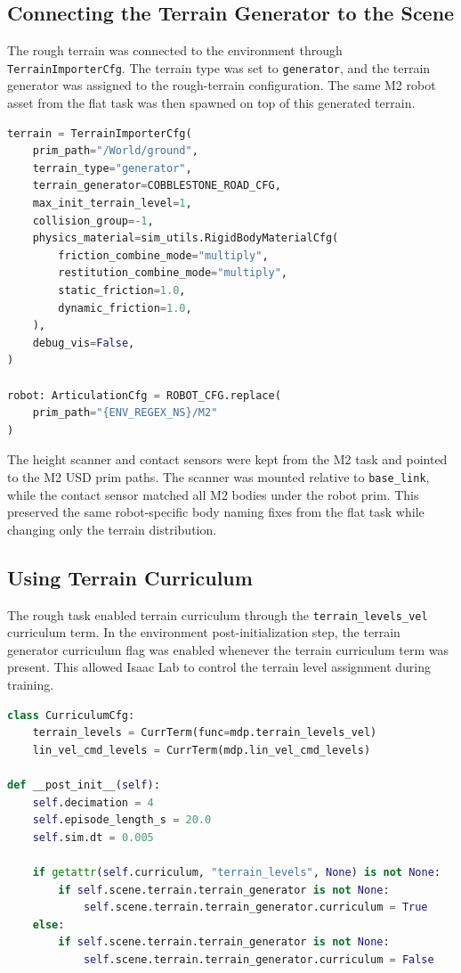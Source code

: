 \subsection{Connecting the Terrain Generator to the Scene}

The rough terrain was connected to the environment through \texttt{TerrainImporterCfg}. The terrain type
was set to \texttt{generator}, and the terrain generator was assigned to the rough-terrain configuration.
The same M2 robot asset from the flat task was then spawned on top of this generated terrain.

\begin{lstlisting}[language=Python,caption={Scene terrain importer for generated rough terrain.}]
terrain = TerrainImporterCfg(
    prim_path="/World/ground",
    terrain_type="generator",
    terrain_generator=COBBLESTONE_ROAD_CFG,
    max_init_terrain_level=1,
    collision_group=-1,
    physics_material=sim_utils.RigidBodyMaterialCfg(
        friction_combine_mode="multiply",
        restitution_combine_mode="multiply",
        static_friction=1.0,
        dynamic_friction=1.0,
    ),
    debug_vis=False,
)

robot: ArticulationCfg = ROBOT_CFG.replace(
    prim_path="{ENV_REGEX_NS}/M2"
)
\end{lstlisting}

The height scanner and contact sensors were kept from the M2 task and pointed to the M2 USD prim
paths. The scanner was mounted relative to \texttt{base\_link}, while the contact sensor matched all M2
bodies under the robot prim. This preserved the same robot-specific body naming fixes from the flat task
while changing only the terrain distribution.

\subsection{Using Terrain Curriculum}

The rough task enabled terrain curriculum through the \texttt{terrain\_levels\_vel} curriculum term. In
the environment post-initialization step, the terrain generator curriculum flag was enabled whenever the
terrain curriculum term was present. This allowed Isaac Lab to control the terrain level assignment during
training.

\begin{lstlisting}[language=Python,caption={Enabling terrain curriculum for the rough generator.}]
class CurriculumCfg:
    terrain_levels = CurrTerm(func=mdp.terrain_levels_vel)
    lin_vel_cmd_levels = CurrTerm(mdp.lin_vel_cmd_levels)

def __post_init__(self):
    self.decimation = 4
    self.episode_length_s = 20.0
    self.sim.dt = 0.005

    if getattr(self.curriculum, "terrain_levels", None) is not None:
        if self.scene.terrain.terrain_generator is not None:
            self.scene.terrain.terrain_generator.curriculum = True
    else:
        if self.scene.terrain.terrain_generator is not None:
            self.scene.terrain.terrain_generator.curriculum = False
\end{lstlisting}

